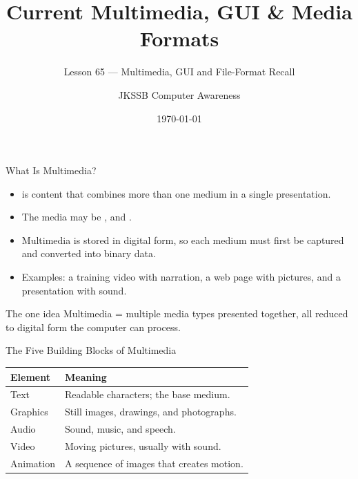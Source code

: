 \documentclass[aspectratio=169]{beamer}
\title{Current Multimedia, GUI \& Media Formats}
\subtitle{Lesson 65 --- Multimedia, GUI and File-Format Recall}
\author{JKSSB Computer Awareness}
\date{\today}
\begin{document}
\frame{\titlepage}

\begin{frame}{What Is Multimedia?}
  \begin{itemize}
    \item {} is content that combines more than one medium in a
      single presentation.
    \item The media may be , and
      .
    \item Multimedia is stored in digital form, so each medium must first be
      captured and converted into binary data.
    \item Examples: a training video with narration, a web page with pictures,
      and a presentation with sound.
  \end{itemize}
  \begin{block}{The one idea}
    Multimedia = multiple media types presented together, all reduced to
    digital form the computer can process.
  \end{block}
\end{frame}

\begin{frame}{The Five Building Blocks of Multimedia}
  \begin{center}
    \begin{tabular}{p{}p{}}
      \toprule
      \textbf{Element} & \textbf{Meaning} \\
      \midrule
      Text & Readable characters; the base medium. \\
      Graphics & Still images, drawings, and photographs. \\
      Audio & Sound, music, and speech. \\
      Video & Moving pictures, usually with sound. \\
      Animation & A sequence of images that creates motion. \\
      \bottomrule
    \end{tabular}
  \end{center}
  \vspace{0.25cm}
\end{frame}
\end{document}
